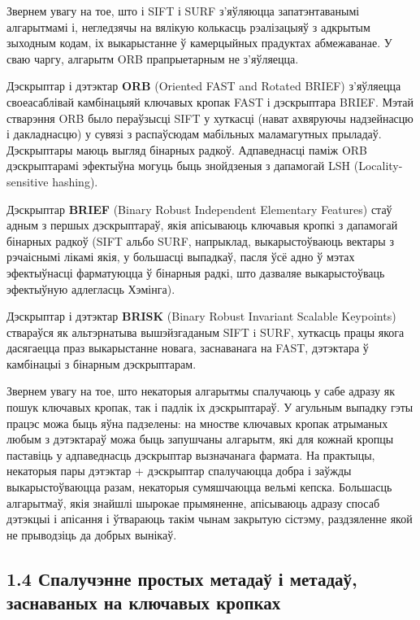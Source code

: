 Звернем увагу на тое, што і SIFT і SURF з'яўляюцца запатэнтаванымі алгарытмамі і, негледзячы на вялікую колькасць рэалізацыяў з адкрытым
зыходным кодам, іх выкарыстанне ў камерцыйных прадуктах абмежаванае. У сваю чаргу, алгарытм ORB прапрыетарным не з'яўляецца.

Дэскрыптар і дэтэктар \textbf{ORB} (Oriented FAST and Rotated BRIEF) \cite{orb-paper} з'яўляецца своеасаблівай камбінацыяй
ключавых кропак FAST і дэскрыптара BRIEF. Мэтай стварэння ORB было пераўзысці SIFT у хуткасці (нават ахвяруючы надзейнасцю і дакладнасцю)
у сувязі з распаўсюдам мабільных маламагутных прыладаў. Дэскрыптары маюць выгляд бінарных радкоў.
Адпаведнасці паміж ORB дэскрыптарамі эфектыўна могуць быць знойдзеныя з дапамогай LSH (Locality-sensitive hashing).

Дэскрыптар \textbf{BRIEF} (Binary Robust Independent Elementary Features) \cite{brief-paper} стаў адным з першых дэскрыптараў,
якія апісываюць ключавыя кропкі
з дапамогай бінарных радкоў (SIFT альбо SURF, напрыклад, выкарыстоўваюць вектары з рэчаіснымі лікамі якія, у большасці выпадкаў,
пасля ўсё адно ў мэтах эфектыўнасці фарматуюцца ў бінарныя радкі, што дазваляе выкарыстоўваць эфектыўную адлегласць Хэмінга).

Дэскрыптар і дэтэктар \textbf{BRISK} (Binary Robust Invariant Scalable Keypoints) \cite{brisk-paper} ствараўся як
альтэрнатыва вышэйзгаданым SIFT i SURF, хуткасць працы якога дасягаецца праз выкарыстанне новага, заснаванага на FAST, дэтэктара
ў камбінацыі з бінарным дэскрыптарам.

Звернем увагу на тое, што некаторыя алгарытмы спалучаюць у сабе адразу як пошук ключавых кропак, так і падлік іх
дэскрыптараў. У агульным выпадку гэты працэс можа быць яўна падзелены: на мностве ключавых кропак атрыманых любым з дэтэктараў
можа быць запушчаны алгарытм, які для кожнай кропцы паставіць у адпаведнасць дэскрыптар вызначанага фармата.
На практыцы, некаторыя пары дэтэктар + дэскрыптар спалучаюцца добра і заўжды выкарыстоўваюцца разам, некаторыя сумяшчаюцца
вельмі кепска. Большасць алгарытмаў, якія знайшлі шырокае прымяненне, апісываюць адразу спосаб дэтэкцыі і апісання і ўтвараюць
такім чынам закрытую сістэму, раздзяленне якой не прыводзіць да добрых вынікаў.

\subsection*{1.4 Спалучэнне простых метадаў і метадаў, заснаваных на ключавых кропках}

